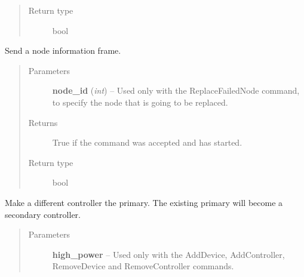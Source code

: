 \documentclass[letterpaper,10pt,english]{sphinxmanual}
\begin{document}
\begin{fulllineitems}
\begin{fulllineitems}
\begin{quote}
\begin{description}
\item[{Return type}] \leavevmode
bool

\end{description}\end{quote}

\end{fulllineitems}


\begin{fulllineitems}
\label{controller:openzwave.controller.ZWaveController.begin_command_send_node_information}
Send a node information frame.
\begin{quote}\begin{description}
\item[{Parameters}] \leavevmode
\textbf{node\_id} (\emph{int}) -- Used only with the ReplaceFailedNode command, to specify the node that is going to be replaced.

\item[{Returns}] \leavevmode
True if the command was accepted and has started.

\item[{Return type}] \leavevmode
bool

\end{description}\end{quote}

\end{fulllineitems}


\begin{fulllineitems}
\label{controller:openzwave.controller.ZWaveController.begin_command_transfer_primary_role}
Make a different controller the primary.
The existing primary will become a secondary controller.
\begin{quote}\begin{description}
\item[{Parameters}] \leavevmode
\textbf{high\_power} -- Used only with the AddDevice, AddController, RemoveDevice and RemoveController commands.

\end{description}\end{quote}


\end{fulllineitems}
\end{fulllineitems}
\end{document}
